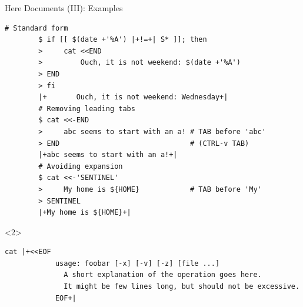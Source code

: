 \begin{frame}[fragile]{Here Documents (III): Examples}
    \vspace{-1mm}
    \begin{lstlisting}[style=MyBash]
        # Standard form
        $ if [[ $(date +'%A') |+!=+| S* ]]; then
        >     cat <<END
        >         Ouch, it is not weekend: $(date +'%A')
        > END
        > fi
        |+       Ouch, it is not weekend: Wednesday+|
        # Removing leading tabs
        $ cat <<-END
        >     abc seems to start with an a! # TAB before 'abc'
        > END                               # (CTRL-v TAB)
        |+abc seems to start with an a!+|
        # Avoiding expansion
        $ cat <<-'SENTINEL'
        >     My home is ${HOME}            # TAB before 'My'
        > SENTINEL
        |+My home is ${HOME}+|
    \end{lstlisting}
    \begin{uncoverenv}<2>
        \begin{lstlisting}[style=MyBash, numbers=none, aboveskip=4pt]
            cat |+<<EOF
            usage: foobar [-x] [-v] [-z] [file ...]
              A short explanation of the operation goes here.
              It might be few lines long, but should not be excessive.
            EOF+|
        \end{lstlisting}
    \end{uncoverenv}
\end{frame}
